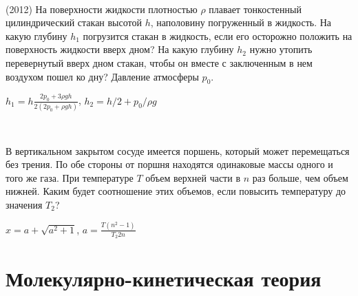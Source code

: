 \begin{ex}
\hspace{0pt} \\
\begin{minipage}{.65\textwidth}
(2012) На поверхности жидкости плотностью $\rho$ плавает тонкостенный цилиндрический стакан высотой $h$, наполовину погруженный в жидкость. 
На какую глубину $h_1$ погрузится стакан в жидкость, если его осторожно положить на поверхность жидкости вверх дном? 
На какую глубину $h_2$ нужно утопить перевернутый вверх дном стакан, чтобы он вместе с заключенным в нем воздухом пошел ко дну? Давление атмосферы $p_0$.
\end{minipage}
\begin{minipage}{.35\textwidth}
\centering

\end{minipage}
\begin{ans}
$h_1 = h \frac{2p_0+3\rho gh}{2(2p_0 + \rho gh)}$, $h_2 = h/2 + p_0/\rho g$
\end{ans}
\end{ex}

\begin{ex}
\hspace{0pt} \\
\begin{minipage}{.65\textwidth}
В вертикальном закрытом сосуде имеется поршень, который может перемещаться без трения. 
По обе стороны от поршня находятся одинаковые массы одного и того же газа. 
При температуре $T$ объем верхней части в $n$ раз больше, чем объем нижней. 
Каким будет соотношение этих объемов, если повысить температуру до значения $T_2$?
\end{minipage}
\begin{minipage}{.35\textwidth}
\centering

\end{minipage}
\begin{ans}
$x = a + \sqrt{a^2+1}$, $a = \frac{T (n^2 - 1)}{T_2 2n}$
\end{ans}
\end{ex}

\section{Молекулярно-кинетическая теория}

